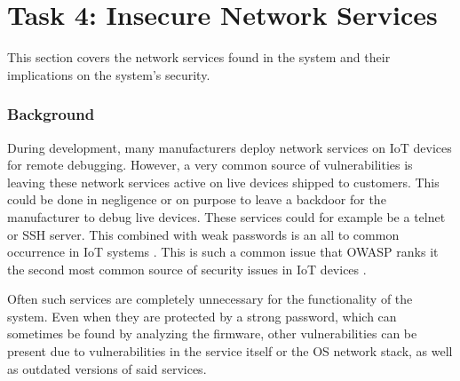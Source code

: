 \section{Task 4: Insecure Network Services} \label{ch:pentesting:network-services}
This section covers the network services found in the system and their implications on the system's security.

\subsubsection{Background}
During development, many manufacturers deploy network services on IoT devices for remote debugging. However, a very common source of vulnerabilities is leaving these network services active on live devices shipped to customers. This could be done in negligence or on purpose to leave a backdoor for the manufacturer to debug live devices. These services could for example be a telnet or SSH server. This combined with weak passwords is an all to common occurrence in IoT systems \cite{understanding-mirai}. This is such a common issue that OWASP ranks it the second most common source of security issues in IoT devices \cite{owasp-iot-top10}.

Often such services are completely unnecessary for the functionality of the system. Even when they are protected by a strong password, which can sometimes be found by analyzing the firmware, other vulnerabilities can be present due to vulnerabilities in the service itself or the OS network stack, as well as outdated versions of said services.

